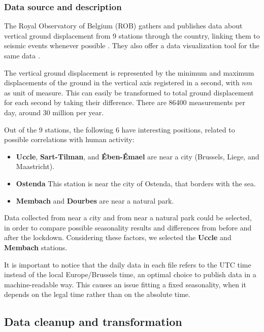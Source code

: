\documentclass[12pt]{article}
\begin{document}
\subsubsection{Data source and description}
The Royal Observatory of Belgium (ROB) gathers and publishes \cite{RoyalDataPolicy,Data20200402} data about vertical ground displacement from 9 stations through the country, linking them to seismic events whenever possible \cite{DataEvents20200402}. They also offer a data visualization tool for the same data \cite{DataVisualization20200402}.

The vertical ground displacement is represented by the minimum and maximum displacements of the ground in the vertical axis registered in a second, with $nm$ as unit of measure. This can easily be transformed to total ground displacement for each second by taking their difference. There are 86400 measurements per day, around 30 million per year.

Out of the 9 stations, the following 6 have interesting positions, related to possible correlations with human activity:
\begin{itemize}[topsep=0.5em,itemsep=0em,partopsep=0.5em]
	\item \textbf{Uccle}, \textbf{Sart-Tilman}, and \textbf{Ében-Émael} are near a city (Brussels, Liege, and Maastricht).
	\item \textbf{Ostenda} This station is near the city of Ostenda, that borders with the sea.
	\item \textbf{Membach} and \textbf{Dourbes} are near a natural park.
\end{itemize}

Data collected from near a city and from near a natural park could be selected, in order to compare possible seasonality results and differences from before and after the lockdown. %
Considering these factors, we selected the \textbf{Uccle} and \textbf{Membach} stations.

It is important to notice that the daily data in each file refers to the UTC time instead of the local Europe/Brussels time, an optimal choice to publish data in a machine-readable way. This causes an issue fitting a fixed seasonality, when it depends on the legal time rather than on the absolute time.

\subsection{Data cleanup and transformation}\label{sec:cleanup-transform}
\end{document}
